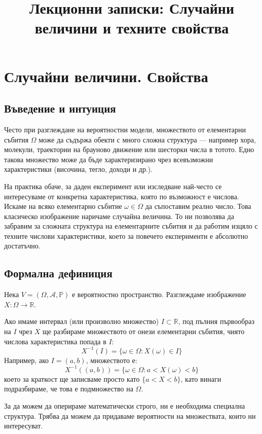 \documentclass{article}
\title{Лекционни записки: Случайни величини и техните свойства}
\author{}
\date{}
\begin{document}
\maketitle

\section{Случайни величини. Свойства}

\subsection{Въведение и интуиция}
Често при разглеждане на вероятностни модели, множеството от елементарни събития $\Omega$ може да съдържа обекти с много сложна структура — например хора, молекули, траектории на брауново движение или шесторки числа в тотото. Едно такова множество може да бъде характеризирано чрез всевъзможни характеристики (височина, тегло, доходи и др.). 

На практика обаче, за даден експеримент или изследване най-често се интересуваме от конкретна характеристика, която по възможност е числова. Искаме на всяко елементарно събитие $\omega \in \Omega$ да съпоставим реално число. Това класическо изображение наричаме случайна величина. То ни позволява да забравим за сложната структура на елементарните събития и да работим изцяло с техните числови характеристики, което за повечето експерименти е абсолютно достатъчно.

\subsection{Формална дефиниция}
Нека $V = (\Omega, \mathcal{A}, \mathbb{P})$ е вероятностно пространство.
Разглеждаме изображение $X: \Omega \rightarrow \mathbb{R}$.

Ако имаме интервал (или произволно множество) $I \subset \mathbb{R}$, под пълния първообраз на $I$ чрез $X$ ще разбираме множеството от онези елементарни събития, чиято числова характеристика попада в $I$:
\[ X^{-1}(I) = \{ \omega \in \Omega : X(\omega) \in I \} \]
Например, ако $I = (a, b)$, множеството е:
\[ X^{-1}((a, b)) = \{ \omega \in \Omega : a < X(\omega) < b \} \]
което за краткост ще записваме просто като $\{ a < X < b \}$, като винаги подразбираме, че това е подмножество на $\Omega$. 

За да можем да оперираме математически строго, ни е необходима специална структура. Трябва да можем да придаваме вероятности на множествата, които ни интересуват.
\end{document}
